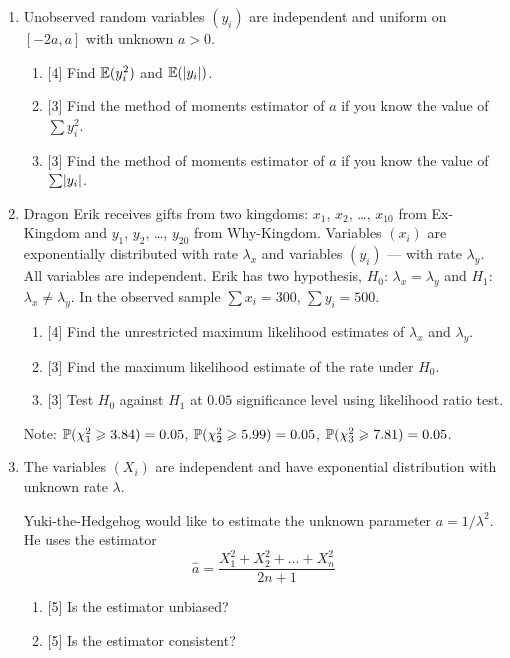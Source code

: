 \begin{enumerate}
    \item Unobserved random variables $(y_i)$ are independent and uniform on $[-2a, a]$ with unknown $a > 0$.

    \begin{enumerate}
        \item {[4]} Find $\E(y_i^2)$ and $\E(\abs{y_i})$.
        \item {[3]} Find the method of moments estimator of $a$ if you know the value of $\sum y_i^2$.
        \item {[3]} Find the method of moments estimator of $a$ if you know the value of $\sum \abs{y_i}$.
    \end{enumerate}

    \item Dragon Erik receives gifts from two kingdoms: $x_1$, $x_2$, \dots, $x_{10}$ from Ex-Kingdom and $y_1$, $y_2$, \dots, $y_{20}$ from Why-Kingdom. 
    Variables $(x_i)$ are exponentially distributed with rate $\lambda_x$ and variables $(y_i)$ — with rate $\lambda_y$.
    All variables are independent. 
    Erik has two hypothesis, $H_0$: $\lambda_x = \lambda_y$ and $H_1$: $\lambda_x \neq \lambda_y$.
    In the observed sample $\sum x_i = 300$, $\sum y_i = 500$.
    
    \begin{enumerate}
        \item {[4]} Find the unrestricted maximum likelihood estimates of $\lambda_x$ and $\lambda_y$.
        \item {[3]} Find the maximum likelihood estimate of the rate under $H_0$.
        \item {[3]} Test $H_0$ against $H_1$ at $0.05$ significance level using likelihood ratio test.
    \end{enumerate}

    Note: $\P(\chi^2_1 \geq 3.84) =0.05$, $\P(\chi^2_2 \geq 5.99 ) =0.05$, $\P(\chi^2_3 \geq 7.81) = 0.05$.

    \item The variables $(X_i)$ are independent and have exponential distribution with unknown rate $\lambda$.
    
    Yuki-the-Hedgehog would like to estimate the unknown parameter $a = 1/\lambda^2$.
    He uses the estimator
    \[
        \hat a = \frac{X_1^2 + X_2^2 + \dots + X_n^2}{2n + 1}
    \]

    \begin{enumerate}
        \item {[5]} Is the estimator unbiased?
        \item {[5]} Is the estimator consistent?
    \end{enumerate}


\end{enumerate}
